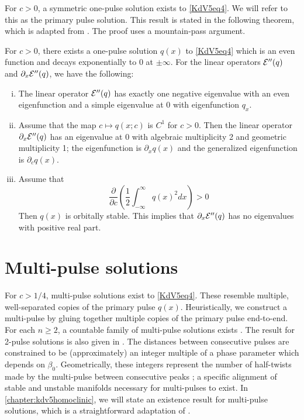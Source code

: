 \documentclass[thesis.tex]{subfiles}
\begin{document}
For $c > 0$, a symmetric one-pulse solution exists to \cref{KdV5eq4}. We will refer to this as the primary pulse solution. This result is stated in the following theorem, which is adapted from \cite[Theorem 2.1]{Pelinovsky2007}. The proof uses a mountain-pass argument.

\begin{theorem}\label{KdV1pulse}
For $c > 0$, there exists a one-pulse solution $q(x)$ to \cref{KdV5eq4} which is an even function and decays exponentially to 0 at $\pm \infty$. For the linear operators $\mathcal{E}''(q)$ and $\partial_x \mathcal{E}''(q)$, we have the following:
\begin{enumerate}[(i)]
\item The linear operator $\mathcal{E}''(q)$ has exactly one negative eigenvalue with an even eigenfunction and a simple eigenvalue at 0 with eigenfunction $q_x$.
\item Assume that the map $c \mapsto q(x; c)$ is $C^1$ for $c > 0$. Then the linear operator $\partial_x \mathcal{E}''(q)$ has an eigenvalue at 0 with algebraic multiplicity 2 and geometric multiplicity 1; the eigenfunction is $\partial_x q(x)$ and the generalized eigenfunction is $\partial_c q(x)$. 
\item Assume that 
\[
\frac{\partial}{\partial c} \left( \frac{1}{2} \int_{-\infty}^\infty q(x)^2 dx \right) > 0
\]
Then $q(x)$ is orbitally stable. This implies that $\partial_x \mathcal{E}''(q)$ has no eigenvalues with positive real part.
\end{enumerate}
\end{theorem}

\section{Multi-pulse solutions}

For $c > 1/4$, multi-pulse solutions exist to \cref{KdV5eq4}. These resemble multiple, well-separated copies of the primary pulse $q(x)$. Heuristically, we construct a multi-pulse by gluing together multiple copies of the primary pulse end-to-end. For each $n \geq 2$, a countable family of multi-pulse solutions exists \cite{Buffoni1996}. The result for 2-pulse solutions is also given in \cite[Theorem 2.2]{Pelinovsky2007}. The distances between consecutive pulses are constrained to be (approximately) an integer multiple of a phase parameter which depends on $\beta_0$. Geometrically, these integers represent the number of half-twists made by the multi-pulse between consecutive peaks \cite{SandstedeStrut}; a specific alignment of stable and unstable manifolds necessary for multi-pulses to exist. In \cref{chapter:kdv5homoclinic}, we will state an existence result for multi-pulse solutions, which is a straightforward adaptation of \cite[Theorem 3.6]{SandstedeStrut}. 
\end{document}
